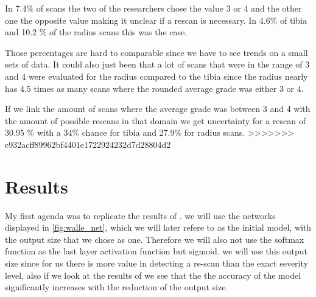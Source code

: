 \documentclass[
a4paper, 
12pt,
grayscalebody, %
abstract=on,
twoside, BCOR10mm, 12pt, DIV13,headinclude, footexclude, final, abstracton, openright
]{ibireprt}
\numberwithin{equation}{chapter}
\numberwithin{table}{chapter}
\numberwithin{figure}{chapter}
\numberwithin{algorithm}{chapter}
\numberwithin{example}{chapter}
\numberwithin{example}{chapter}
\begin{document}
In 7.4\% of scans the two of the researchers chose the value 3 or 4 and the other one the opposite value making it unclear if a rescan is necessary. In 4.6\% of tibia and 10.2 \% of the radius scans this was the case. 

Those percentages are hard to comparable since we have to see trends on a small sets of data. It could also just been that a lot of scans that were in the range of 3 and 4 were evaluated for the radius compared to the tibia since the radius nearly has 4.5 times as many scans where the rounded average grade was either 3 or 4.


If we link the amount of scans where the average grade was between 3 and 4 with the amount of possible rescans in that domain we get uncertainty for a rescan of 30.95 \% with a 34\% chance for tibia and 27.9\% for radius scans. 
>>>>>>> e932acff89962bf4401e1722924232d7d28804d2




\chapter{Results}


My first agenda was to replicate the results of \cite{Walle2023}. we will use the networks displayed in \ref{fig:walle_net}, which we will later refere to as the initial model, with the output size that we chose as one. Therefore we will also not use the softmax function as the last layer activation function but sigmoid. we will use this output size since for us there is more value in detecting a re-scan than the exact severity level, also if we look at the results of \cite{Walle2023}  we see that the the accuracy of the model significantly increases with the reduction of the output size.
\end{document}
